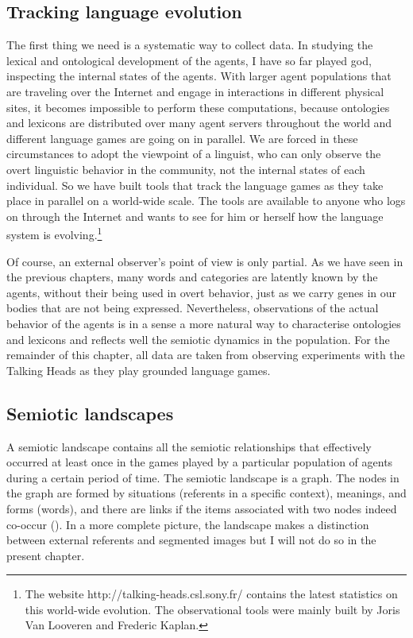 \subsection{Tracking language evolution}

The first thing we need is a systematic
way to collect data. In studying the lexical 
and ontological development 
of the agents, I have so far played god, inspecting 
the internal states of the agents. With larger agent
populations that 
are traveling over the Internet and engage in interactions in 
different physical sites, it becomes impossible
to perform these computations, because ontologies and 
lexicons are distributed over many agent servers
throughout the world and different language games are
going on in parallel. We 
are forced in these circumstances to adopt the
viewpoint of a linguist, who
can only observe the overt linguistic behavior in the community,
not the internal states of each individual. 
So we have built tools that track the language games 
as they take place in parallel on a world-wide scale. The tools 
are available to anyone who logs on through the Internet
and wants to see for him or herself how the language
system is evolving.\footnote{The website http://talking-heads.csl.sony.fr/ 
contains the latest statistics on this world-wide evolution. 
The observational tools were mainly built by Joris Van 
Looveren and Frederic Kaplan.}

Of course, an external observer's
point of view is only partial. As we have seen in the
previous chapters, many 
words and categories are latently known by the agents, 
without their being used in overt behavior, just as 
we carry genes in our bodies that are not 
being expressed. Nevertheless, 
observations of the actual behavior of the agents is
in a sense a more natural way to characterise 
ontologies and lexicons and reflects well the
semiotic dynamics in the population. For the remainder
of this chapter, all data
are taken from observing experiments with the Talking Heads as
they play grounded language games. 

\subsection{Semiotic landscapes}

A semiotic landscape contains all the semiotic relationships
that effectively occurred at least once
in the games played by a particular population of agents
during a certain period of time. 
The semiotic landscape is a graph. The nodes in the
graph are formed by situations (referents in a specific context), 
meanings, and forms (words),
and there are links if the items associated with two nodes
indeed co-occur (). In a more complete
picture, the landscape makes a distinction between 
external referents and segmented images but I will not 
do so in the present chapter. 

